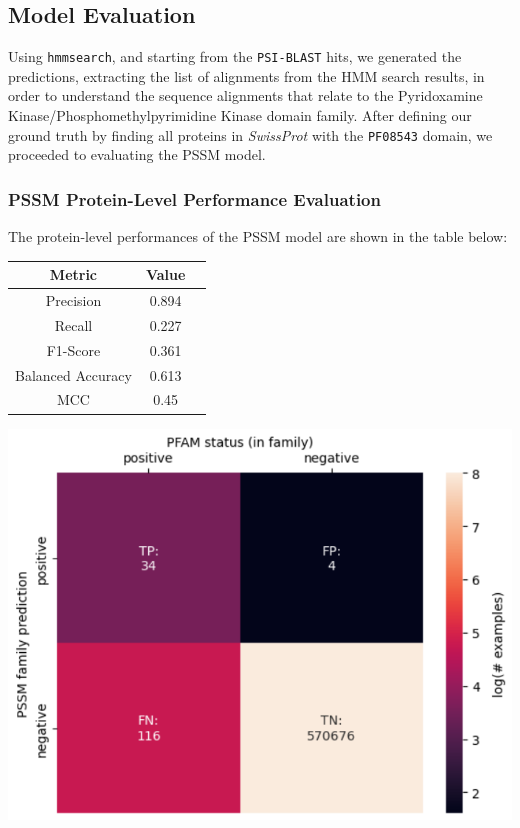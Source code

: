 \documentclass[10pt,twocolumn,letterpaper]{article}
\begin{document}
\subsection{Model Evaluation}

Using \texttt{hmmsearch}, and starting from the \texttt{PSI-BLAST} hits, we generated the predictions, extracting the list of alignments from the HMM search results, in order to understand the sequence alignments that relate to the Pyridoxamine Kinase/Phosphomethylpyrimidine Kinase domain family.
After defining our ground truth by finding all proteins in \textit{SwissProt} with the \texttt{PF08543} domain, we proceeded to evaluating the PSSM model.



\subsubsection{PSSM Protein-Level Performance Evaluation}

The protein-level performances of the PSSM model are shown in the table below:

\begin{center}
    \begin{tabular}{ccc}
        \toprule
        Metric & Value \\
        \midrule
        Precision & 0.894 \\
        Recall & 0.227 \\
        F1-Score & 0.361 \\
        Balanced Accuracy & 0.613 \\
        MCC & 0.45 \\
        \bottomrule
    \end{tabular}
\end{center} 

\begin{center}
    \includegraphics[scale=0.5]{img/pssm_protein_level_eval.png}
\end{center}
\end{document}

